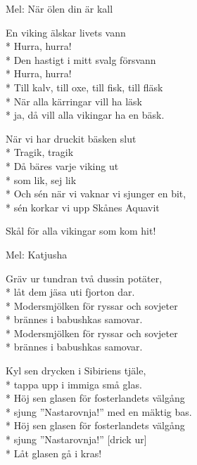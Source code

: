 \begin{SongText}[Vikingen]
    \begin{SongInfo}
        Mel: När ölen din är kall
    \end{SongInfo}
    \begin{SongVerse}
        En viking älskar livets vann\\*%
        Hurra, hurra!\\*%
        Den hastigt i mitt svalg försvann\\*%
        Hurra, hurra!\\*%
        Till kalv, till oxe, till fisk, till fläsk\\*%
        När alla kärringar vill ha läsk\\*%
        ja, då vill alla vikingar ha en bäsk.
    \end{SongVerse}
    \begin{SongVerse}
        När vi har druckit bäsken slut\\*%
        Tragik, tragik\\*%
        Då bäres varje viking ut\\*%
        som lik, sej lik\\*%
        Och sén när vi vaknar vi sjunger en bit,\\*%
        sén korkar vi upp Skånes Aquavit
    \end{SongVerse}
    \begin{SongVerse}
        Skål för alla vikingar som kom hit!
    \end{SongVerse}
\end{SongText}
\begin{SongText}
    \begin{SongInfo}
        Mel: Katjusha
    \end{SongInfo}
    \begin{SongVerse}
        Gräv ur tundran två dussin potäter,\\*%
        låt dem jäsa uti fjorton dar.\\*%
        Modersmjölken för ryssar och sovjeter\\*%
        brännes i babushkas samovar.\\*%
        Modersmjölken för ryssar och sovjeter\\*%
        brännes i babushkas samovar.
    \end{SongVerse}
    \begin{SongVerse}
        Kyl sen drycken i Sibiriens tjäle,\\*%
        tappa upp i immiga små glas.\\*%
        Höj sen glasen för fosterlandets välgång\\*%
        sjung ”Nastarovnja!” med en mäktig bas.\\*%
        Höj sen glasen för fosterlandets välgång\\*%
        sjung ”Nastarovnja!” [drick ur]\\*%
        Låt glasen gå i kras!
    \end{SongVerse}
\end{SongText}
